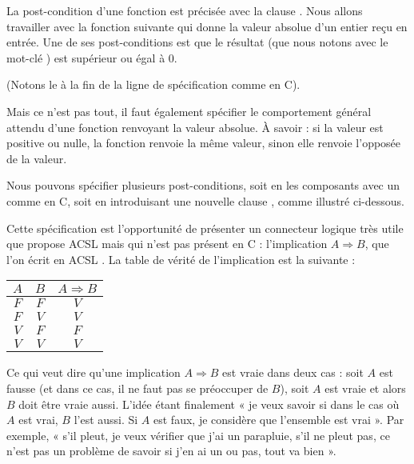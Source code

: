 

La post-condition d'une fonction est précisée avec la clause . 
Nous allons travailler avec la fonction suivante qui donne la valeur absolue
d'un entier reçu en entrée. 
Une de ses post-conditions est que le résultat (que nous notons avec le 
mot-clé ) est supérieur ou égal à 0.






(Notons le \CodeInline{;} à la fin de la ligne de spécification comme en C).



Mais ce n'est pas tout, il faut également spécifier le comportement général 
attendu d'une fonction renvoyant la valeur absolue. À savoir : si la valeur
est positive ou nulle, la fonction renvoie la même valeur, sinon elle renvoie 
l'opposée de la valeur.



Nous pouvons spécifier plusieurs post-conditions, soit en les composants avec 
un \CodeInline{\&\&} comme en C, soit en introduisant une nouvelle clause , 
comme illustré ci-dessous.






Cette spécification est l'opportunité de présenter un connecteur logique 
très utile que propose ACSL mais qui n'est pas présent en C : 
l'implication $A \Rightarrow B$, que l'on écrit en ACSL .
La table de vérité de l'implication est la suivante :



\begin{longtabu}{|c|c|c|} \hline
$A$ & $B$ & $A \Rightarrow B$ \\ \hline
$F$ & $F$ & $V$ \\ \hline
$F$ & $V$ & $V$ \\ \hline
$V$ & $F$ & $F$ \\ \hline
$V$ & $V$ & $V$ \\ \hline
\end{longtabu}



Ce qui veut dire qu'une implication $A \Rightarrow B$ est vraie dans deux cas : 
soit $A$ est fausse (et dans ce cas, il ne faut pas se préoccuper de $B$), soit 
$A$ est vraie et alors $B$ doit être vraie aussi. L'idée étant finalement « je 
veux savoir si dans le cas où $A$ est vrai, $B$ l'est aussi. Si $A$ est faux, 
je considère que l'ensemble est vrai ». Par exemple, « s'il pleut, je veux
vérifier que j'ai un parapluie, s'il ne pleut pas, ce n'est pas un problème
de savoir si j'en ai un ou pas, tout va bien ».



